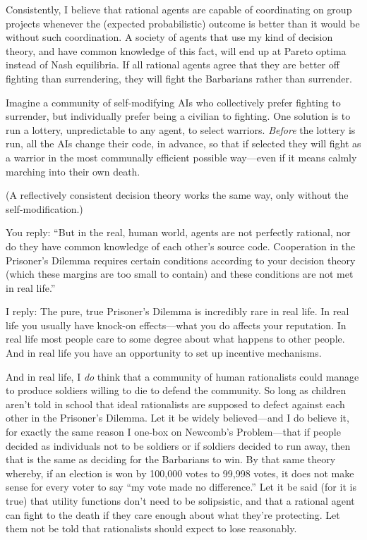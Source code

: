 {
 Consistently, I believe that rational agents are capable of
coordinating on group projects whenever the (expected probabilistic)
outcome is better than it would be without such coordination. A society
of agents that use my kind of decision theory, and have common
knowledge of this fact, will end up at Pareto optima instead of Nash
equilibria. If all rational agents agree that they are better off
fighting than surrendering, they will fight the Barbarians rather than
surrender.}

{
 Imagine a community of self-modifying AIs who collectively prefer
fighting to surrender, but individually prefer being a civilian to
fighting. One solution is to run a lottery, unpredictable to any agent,
to select warriors. \textit{Before} the lottery is run, all the AIs
change their code, in advance, so that if selected they will fight as a
warrior in the most communally efficient possible way---even if it
means calmly marching into their own death.}

{
 (A reflectively consistent decision theory works the same way,
only without the self-modification.)}

{
 You reply: ``But in the real, human world, agents
are not perfectly rational, nor do they have common knowledge of each
other's source code. Cooperation in the
Prisoner's Dilemma requires certain conditions
according to your decision theory (which these margins are too small to
contain) and these conditions are not met in real
life.''}

{
 I reply: The pure, true Prisoner's Dilemma is
incredibly rare in real life. In real life you usually have knock-on
effects---what you do affects your reputation. In real life most people
care to some degree about what happens to other people. And in real
life you have an opportunity to set up incentive mechanisms.}

{
 And in real life, I \textit{do} think that a community of human
rationalists could manage to produce soldiers willing to die to defend
the community. So long as children aren't told in
school that ideal rationalists are supposed to defect against each
other in the Prisoner's Dilemma. Let it be widely
believed---and I do believe it, for exactly the same reason I one-box
on Newcomb's Problem---that if people decided as
individuals not to be soldiers or if soldiers decided to run away, then
that is the same as deciding for the Barbarians to win. By that same
theory whereby, if an election is won by 100,000 votes to 99,998 votes,
it does not make sense for every voter to say ``my
vote made no difference.'' Let it be said (for it is
true) that utility functions don't need to be
solipsistic, and that a rational agent can fight to the death if they
care enough about what they're protecting. Let them not
be told that rationalists should expect to lose reasonably.}

